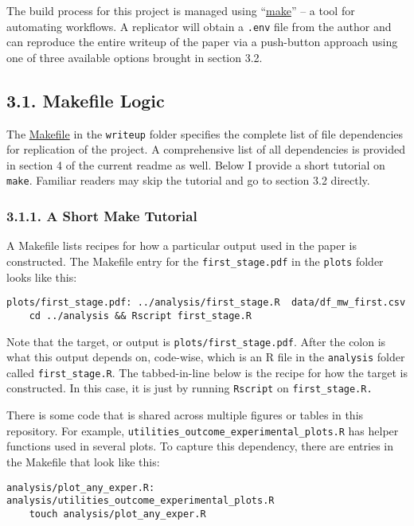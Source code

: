 \documentclass[10pt]{article}
\begin{document}
The build process for this project is managed using ``\href{https://www.gnu.org/software/make/manual/make.html}{make}'' -- a tool for automating workflows.
A replicator will obtain a \texttt{.env} file from the author and can reproduce the entire writeup of the paper via a push-button approach using one of three available options brought in section 3.2.

\subsection*{3.1. Makefile Logic}

The \href{https://www.github.com/johnjosephhorton/minimum_wage/blob/main/writeup/Makefile}{Makefile} in the \texttt{writeup} folder specifies the complete list of file dependencies for replication of the project. 
A comprehensive list of all dependencies is provided in section 4 of the current readme as well.
Below I provide a short tutorial on \texttt{make}. 
Familiar readers may skip the tutorial and go to section 3.2 directly.

\subsubsection*{3.1.1. A Short Make Tutorial}
A Makefile lists recipes for how a particular output used in the paper is constructed.
The Makefile entry for the \texttt{first\_stage.pdf} in the \texttt{plots} folder looks like this: 

\begin{verbatim}
plots/first_stage.pdf: ../analysis/first_stage.R  data/df_mw_first.csv
	cd ../analysis && Rscript first_stage.R
\end{verbatim}

Note that the target, or output is \texttt{plots/first\_stage.pdf}.  
After the colon is what this output depends on, code-wise, which is an R file in the \texttt{analysis} folder called \texttt{first\_stage.R}.
The tabbed-in-line below is the recipe for how the target is constructed. 
In this case, it is just by running \texttt{Rscript} on \texttt{first\_stage.R.}

There is some code that is shared across multiple figures or tables in this repository. 
For example, \texttt{utilities\_outcome\_experimental\_plots.R} has helper functions used in several plots.
To capture this dependency, there are entries in the Makefile that look like this: 

\begin{verbatim}
analysis/plot_any_exper.R: analysis/utilities_outcome_experimental_plots.R
	touch analysis/plot_any_exper.R
\end{verbatim}
\end{document}
